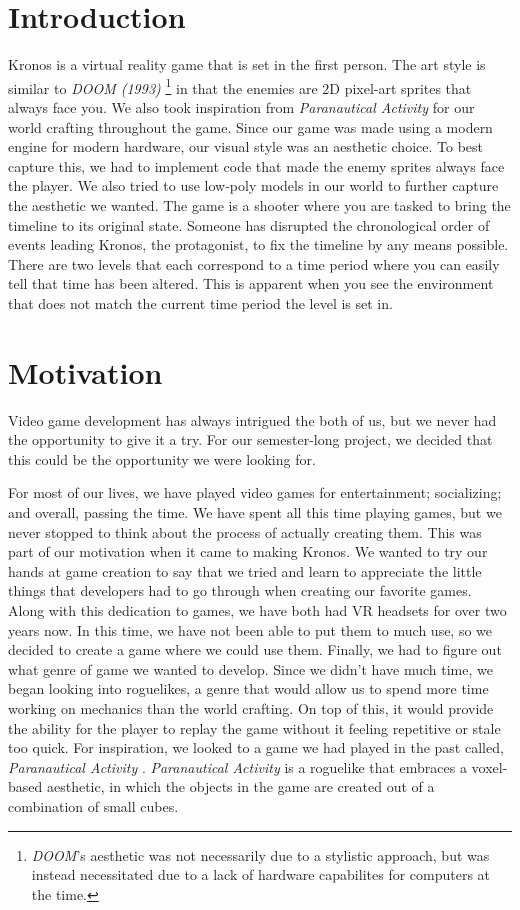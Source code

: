 \documentclass{sigchi}
\begin{document}
\section{Introduction}
Kronos is a virtual reality game that is set in the first person. The art style is similar to \textit{DOOM (1993)} \footnote[1]{\textit{DOOM}'s aesthetic was not necessarily due to a stylistic approach, but was instead necessitated due to a lack of hardware capabilites for computers at the time.} \cite{doom} in that the enemies are 2D pixel-art sprites that always face you. We also took inspiration from \textit{Paranautical Activity} \cite{paranautical} for our world crafting throughout the game. Since our game was made using a modern engine for modern hardware, our visual style was an aesthetic choice. To best capture this, we had to implement code that made the enemy sprites always face the player. We also tried to use low-poly models in our world to further capture the aesthetic we wanted. The game is a shooter where you are tasked to bring the timeline to its original state. Someone has disrupted the chronological order of events leading Kronos, the protagonist, to fix the timeline by any means possible. There are two levels that each correspond to a time period where you can easily tell that time has been altered. This is apparent when you see the environment that does not match the current time period the level is set in. 

\section{Motivation}
Video game development has always intrigued the both of us, but we never had the opportunity to give it a try. For our semester-long project, we decided that this could be the opportunity we were looking for.



For most of our lives, we have played video games for entertainment; socializing; and overall, passing the time. We have spent all this time playing games, but we never stopped to think about the process of actually creating them. This was part of our motivation when it came to making Kronos. We wanted to try our hands at game creation to say that we tried and learn to appreciate the little things that developers had to go through when creating our favorite games. Along with this dedication to games, we have both had VR headsets for over two years now. In this time, we have not been able to put them to much use, so we decided to create a game where we could use them. Finally, we had to figure out what genre of game we wanted to develop. Since we didn’t have much time, we began looking into roguelikes, a genre that would allow us to spend more time working on mechanics than the world crafting. On top of this, it would provide the ability for the player to replay the game without it feeling repetitive or stale too quick. For inspiration, we looked to a game we had played in the past called, \textit{Paranautical Activity} \cite{paranautical}. \textit{Paranautical Activity} \cite{paranautical} is a roguelike that embraces a voxel-based aesthetic, in which the objects in the game are created out of a combination of small cubes. 
\end{document}
